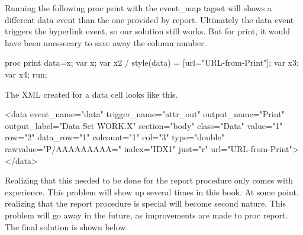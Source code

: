 Running the following proc print with the event\_map tagset will shows a different
data event than the one provided by report.  Ultimately the data event triggers the
hyperlink event, so our solution still works.  But for print, it would have been
unessecary to save away the column number.

\begin{sfvcode}
proc print data=x;
    var x;
    var x2 / style(data) = [url="URL-from-Print"];
    var x3;
    var x4;
run;
\end{sfvcode}

The XML created for a data cell looks like this.

\begin{sfvoutput}
   <data event_name="data" trigger_name="attr_out" output_name="Print" 
     output_label="Data Set WORK.X" section="body" class="Data" value="1" 
     row="2" data_row="1" colcount="1" col="3" type="double" 
     rawvalue="P/AAAAAAAAA=" index="IDX1" just="r" url="URL-from-Print">
   </data>
\end{sfvoutput}

Realizing that this needed to be done for the report procedure only comes with experience. 
This problem will show up several times in this book.  At some point, realizing
that the report procedure is special will become second nature.  This problem will
go away in the future, as improvements are made to proc report. 
The final solution is shown below.

